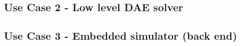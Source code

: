 \documentclass[compress,newPxFont,sthlmFooter]{beamer}
\begin{document}
\subsection{Use Case 2 - Low level DAE solver}
\begin{frame}
\frametitle{}
\end{frame}

\subsection{Use Case 3 - Embedded simulator (back end)}
\begin{frame}
\frametitle{}
\end{frame}

% 
% 
% 
% 
% 
% 
\end{document}
